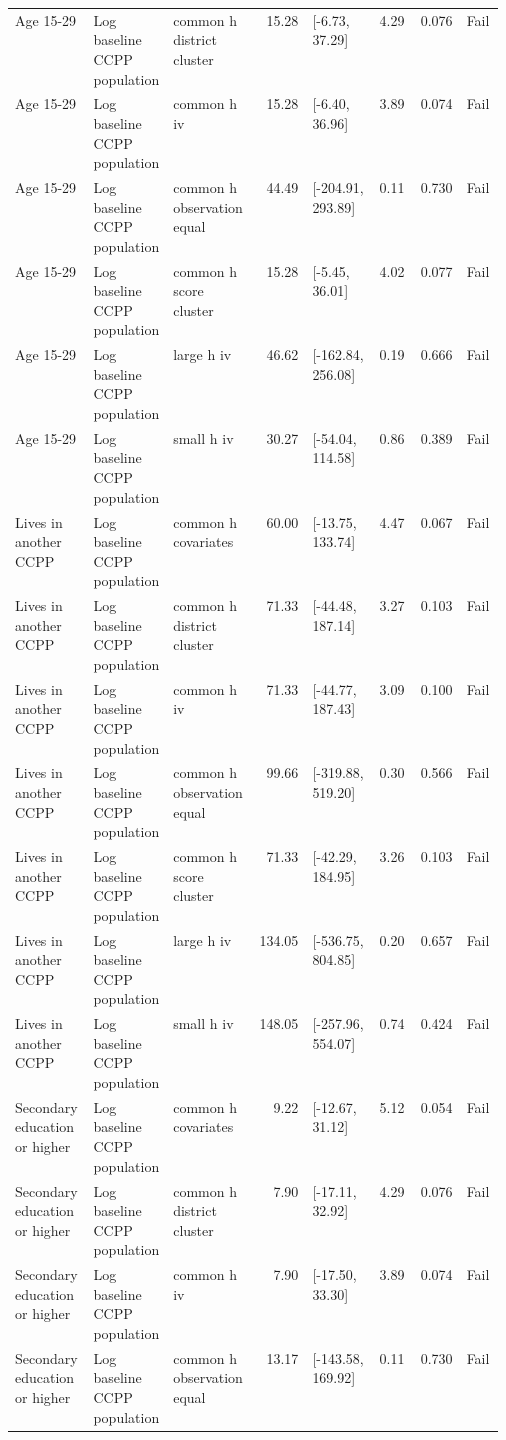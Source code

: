 \begin{longtable}{@{}p{0.16\linewidth}p{0.14\linewidth}p{0.14\linewidth}rp{0.13\linewidth}rrl@{}}
Age 15-29 & Log baseline CCPP population & common h district cluster & 15.28 & [-6.73, 37.29] & 4.29 & 0.076 & Fail \\
Age 15-29 & Log baseline CCPP population & common h iv & 15.28 & [-6.40, 36.96] & 3.89 & 0.074 & Fail \\
Age 15-29 & Log baseline CCPP population & common h observation equal & 44.49 & [-204.91, 293.89] & 0.11 & 0.730 & Fail \\
Age 15-29 & Log baseline CCPP population & common h score cluster & 15.28 & [-5.45, 36.01] & 4.02 & 0.077 & Fail \\
Age 15-29 & Log baseline CCPP population & large h iv & 46.62 & [-162.84, 256.08] & 0.19 & 0.666 & Fail \\
Age 15-29 & Log baseline CCPP population & small h iv & 30.27 & [-54.04, 114.58] & 0.86 & 0.389 & Fail \\
Lives in another CCPP & Log baseline CCPP population & common h covariates & 60.00 & [-13.75, 133.74] & 4.47 & 0.067 & Fail \\
Lives in another CCPP & Log baseline CCPP population & common h district cluster & 71.33 & [-44.48, 187.14] & 3.27 & 0.103 & Fail \\
Lives in another CCPP & Log baseline CCPP population & common h iv & 71.33 & [-44.77, 187.43] & 3.09 & 0.100 & Fail \\
Lives in another CCPP & Log baseline CCPP population & common h observation equal & 99.66 & [-319.88, 519.20] & 0.30 & 0.566 & Fail \\
Lives in another CCPP & Log baseline CCPP population & common h score cluster & 71.33 & [-42.29, 184.95] & 3.26 & 0.103 & Fail \\
Lives in another CCPP & Log baseline CCPP population & large h iv & 134.05 & [-536.75, 804.85] & 0.20 & 0.657 & Fail \\
Lives in another CCPP & Log baseline CCPP population & small h iv & 148.05 & [-257.96, 554.07] & 0.74 & 0.424 & Fail \\
Secondary education or higher & Log baseline CCPP population & common h covariates & 9.22 & [-12.67, 31.12] & 5.12 & 0.054 & Fail \\
Secondary education or higher & Log baseline CCPP population & common h district cluster & 7.90 & [-17.11, 32.92] & 4.29 & 0.076 & Fail \\
Secondary education or higher & Log baseline CCPP population & common h iv & 7.90 & [-17.50, 33.30] & 3.89 & 0.074 & Fail \\
Secondary education or higher & Log baseline CCPP population & common h observation equal & 13.17 & [-143.58, 169.92] & 0.11 & 0.730 & Fail \\

\end{longtable}
